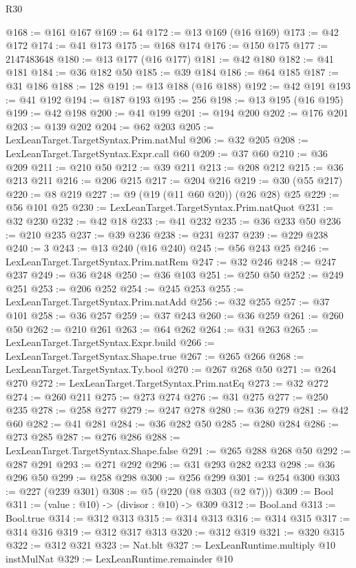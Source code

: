 \begin{lexlean}{R30}
\begin{coremodule}
@168 := @161 @167
@169 := 64
@172 := @13 @169 (@16 @169)
@173 := @42 @172
@174 := @41 @173
@175 := @168 @174
@176 := @150 @175
@177 := 2147483648
@180 := @13 @177 (@16 @177)
@181 := @42 @180
@182 := @41 @181
@184 := @36 @182 @50
@185 := @39 @184
@186 := @64 @185
@187 := @31 @186
@188 := 128
@191 := @13 @188 (@16 @188)
@192 := @42 @191
@193 := @41 @192
@194 := @187 @193
@195 := 256
@198 := @13 @195 (@16 @195)
@199 := @42 @198
@200 := @41 @199
@201 := @194 @200
@202 := @176 @201
@203 := @139 @202
@204 := @62 @203
@205 := LexLeanTarget.TargetSyntax.Prim.natMul
@206 := @32 @205
@208 := LexLeanTarget.TargetSyntax.Expr.call @60
@209 := @37 @60
@210 := @36 @209
@211 := @210 @50
@212 := @39 @211
@213 := @208 @212
@215 := @36 @213 @211
@216 := @206 @215
@217 := @204 @216
@219 := @30 (@55 @217)
@220 := @8 @219
@227 := @9 (@19 (@11 @60 @20)) (@26 @28) @25
@229 := @56 @101 @25
@230 := LexLeanTarget.TargetSyntax.Prim.natQuot
@231 := @32 @230
@232 := @42 @18
@233 := @41 @232
@235 := @36 @233 @50
@236 := @210 @235
@237 := @39 @236
@238 := @231 @237
@239 := @229 @238
@240 := 3
@243 := @13 @240 (@16 @240)
@245 := @56 @243 @25
@246 := LexLeanTarget.TargetSyntax.Prim.natRem
@247 := @32 @246
@248 := @247 @237
@249 := @36 @248
@250 := @36 @103
@251 := @250 @50
@252 := @249 @251
@253 := @206 @252
@254 := @245 @253
@255 := LexLeanTarget.TargetSyntax.Prim.natAdd
@256 := @32 @255
@257 := @37 @101
@258 := @36 @257
@259 := @37 @243
@260 := @36 @259
@261 := @260 @50
@262 := @210 @261
@263 := @64 @262
@264 := @31 @263
@265 := LexLeanTarget.TargetSyntax.Expr.build
@266 := LexLeanTarget.TargetSyntax.Shape.true
@267 := @265 @266
@268 := LexLeanTarget.TargetSyntax.Ty.bool
@270 := @267 @268 @50
@271 := @264 @270
@272 := LexLeanTarget.TargetSyntax.Prim.natEq
@273 := @32 @272
@274 := @260 @211
@275 := @273 @274
@276 := @31 @275
@277 := @250 @235
@278 := @258 @277
@279 := @247 @278
@280 := @36 @279
@281 := @42 @60
@282 := @41 @281
@284 := @36 @282 @50
@285 := @280 @284
@286 := @273 @285
@287 := @276 @286
@288 := LexLeanTarget.TargetSyntax.Shape.false
@291 := @265 @288 @268 @50
@292 := @287 @291
@293 := @271 @292
@296 := @31 @293 @282 @233
@298 := @36 @296 @50
@299 := @258 @298
@300 := @256 @299
@301 := @254 @300
@303 := @227 (@239 @301)
@308 := @5 (@220 (@8 @303 (@2 @7)))
@309 := Bool
@311 := (value : @10) -> (divisor : @10) -> @309
@312 := Bool.and
@313 := Bool.true
@314 := @312 @313
@315 := @314 @313
@316 := @314 @315
@317 := @314 @316
@319 := @312 @317 @313
@320 := @312 @319
@321 := @320 @315
@322 := @312 @321
@323 := Nat.blt
@327 := LexLeanRuntime.multiply @10 instMulNat
@329 := LexLeanRuntime.remainder @10

\end{coremodule}
\end{lexlean}
